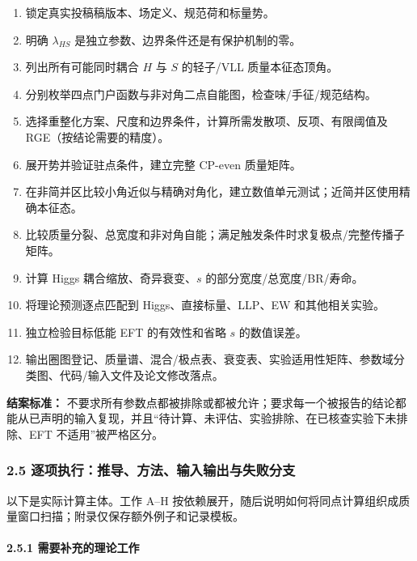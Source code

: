 \documentclass[
]{article}
\providecommand{\tightlist}{%
  \setlength{\itemsep}{0pt}\setlength{\parskip}{0pt}}
\begin{document}
\begin{enumerate}
\def\labelenumi{\arabic{enumi}.}
\tightlist
\item
  锁定真实投稿稿版本、场定义、规范荷和标量势。
\item
  明确 \(\lambda_{HS}\) 是独立参数、边界条件还是有保护机制的零。
\item
  列出所有可能同时耦合 \(H\) 与 \(S\) 的轻子/VLL 质量本征态顶角。
\item
  分别枚举四点门户函数与非对角二点自能图，检查味/手征/规范结构。
\item
  选择重整化方案、尺度和边界条件，计算所需发散项、反项、有限阈值及
  RGE（按结论需要的精度）。
\item
  展开势并验证驻点条件，建立完整 CP-even 质量矩阵。
\item
  在非简并区比较小角近似与精确对角化，建立数值单元测试；近简并区使用精确本征态。
\item
  比较质量分裂、总宽度和非对角自能；满足触发条件时求复极点/完整传播子矩阵。
\item
  计算 Higgs 耦合缩放、奇异衰变、\(s\) 的部分宽度/总宽度/BR/寿命。
\item
  将理论预测逐点匹配到 Higgs、直接标量、LLP、EW 和其他相关实验。
\item
  独立检验目标低能 EFT 的有效性和省略 \(s\) 的数值误差。
\item
  输出圈图登记、质量谱、混合/极点表、衰变表、实验适用性矩阵、参数域分类图、代码/输入文件及论文修改落点。
\end{enumerate}

\textbf{结案标准：}
不要求所有参数点都被排除或都被允许；要求每一个被报告的结论都能从已声明的输入复现，并且``待计算、未评估、实验排除、在已核查实验下未排除、EFT
不适用''被严格区分。

\subsubsection{2.5
逐项执行：推导、方法、输入输出与失败分支}\label{ux9010ux9879ux6267ux884cux63a8ux5bfcux65b9ux6cd5ux8f93ux5165ux8f93ux51faux4e0eux5931ux8d25ux5206ux652f}

以下是实际计算主体。工作 A--H
按依赖展开，随后说明如何将同点计算组织成质量窗口扫描；附录仅保存额外例子和记录模板。

\paragraph{2.5.1
需要补充的理论工作}\label{ux9700ux8981ux8865ux5145ux7684ux7406ux8bbaux5de5ux4f5c}
\end{document}
